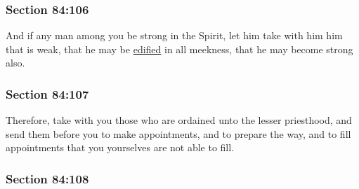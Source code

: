 
	\subsubsection{Section 84:106} %
		\label{DC84-106}

		And if any man among you be strong in the Spirit, let him take with him him that is weak, that he may be \hyperref[EDIFICATION]{edified} in all meekness, that he may become strong also.


	\subsubsection{Section 84:107} %
		\label{DC84-107}

		Therefore, take with you those who are ordained unto the lesser priesthood, and send them before you to make appointments, and to prepare the way, and to fill appointments that you yourselves are not able to fill.


	\subsubsection{Section 84:108} %
		\label{DC84-108}

